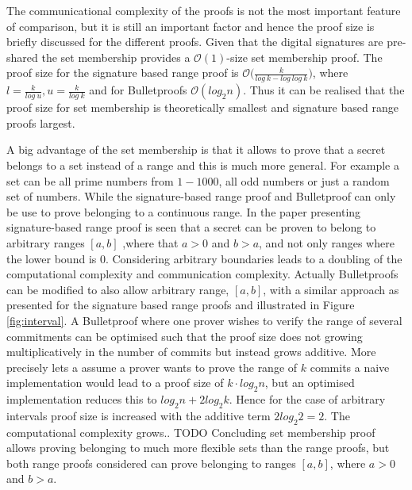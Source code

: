 The communicational complexity of the proofs is not the most important feature of comparison, but it is still an important factor and hence the proof size  is briefly discussed  for the different proofs. Given that the digital signatures are pre-shared the set membership provides a $\mathcal{O}(1)$-size set membership proof. The proof size for the signature based range proof is $\mathcal{O}\big(\frac{k}{log\: k- log\:log\:k}\big)$, where $l = \frac{k}{log\: u}, u = \frac{k}{log\: k}$ and for Bulletproofs $\mathcal{O}(log_2n)$. Thus it can be realised that the proof size for set membership is theoretically smallest and signature based range proofs largest. 

A big advantage of the set membership is that it allows to prove that a secret belongs to a set instead of a range and this is much more general. For example a set can be all prime numbers from $1-1000$, all odd numbers or just a random set of numbers. While the signature-based range proof and Bulletproof can only be use to prove belonging to a continuous range. In the paper presenting signature-based range proof is seen that a secret can be proven to belong to arbitrary ranges $[a,b]$ ,where that $a>0$ and $b>a$, and not only ranges where the lower bound is $0$. Considering arbitrary boundaries leads to a doubling of the computational complexity and communication complexity. Actually Bulletproofs can be modified to also allow arbitrary range, $[a,b]$, with a similar approach as presented for the signature based range proofs and illustrated in Figure \ref{fig:interval}. A Bulletproof where one prover wishes to verify the range of several commitments can be optimised such that the  proof size does not growing multiplicatively in the number of commits but instead grows additive. More precisely lets a assume a prover wants to prove the range of $k$ commits a naive implementation would lead to a proof size of $k\cdot log_2 n $, but an optimised implementation reduces this to $log_2 n + 2 log_2 k$.  Hence for the case of arbitrary intervals  proof size is increased with the additive term $2log_2 2 = 2$. The computational complexity grows.. TODO %
Concluding set membership proof allows proving belonging to much more flexible sets than the range proofs, but both range proofs considered can prove belonging to ranges $[a,b]$, where $a>0$ and $b>a$. 

